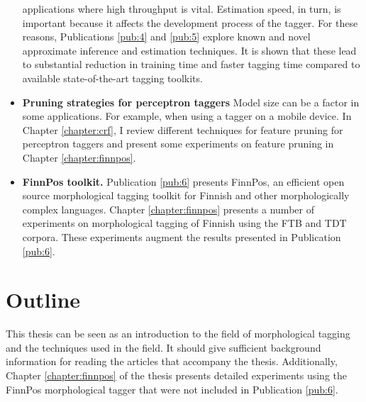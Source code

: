 \begin{itemize}
  applications where high throughput is vital. Estimation speed, in
  turn, is important because it affects the development process of the
  tagger. For these reasons, Publications \ref{pub:4} and \ref{pub:5}
  explore known and novel approximate inference and estimation
  techniques. It is shown that these lead to substantial reduction in
  training time and faster tagging time compared to available
  state-of-the-art tagging toolkits.
\item {\bf Pruning strategies for perceptron taggers} Model size can
  be a factor in some applications. For example, when using a tagger
  on a mobile device. In Chapter \ref{chapter:crf}, I review different
  techniques for feature pruning for perceptron taggers and present
  some experiments on feature pruning in Chapter
  \ref{chapter:finnpos}.
\item {\bf FinnPos toolkit.} Publication \ref{pub:6} presents FinnPos,
  an efficient open source morphological tagging toolkit for Finnish
  and other morphologically complex languages. Chapter
  \ref{chapter:finnpos} presents a number of experiments on
  morphological tagging of Finnish using the FTB and TDT
  corpora. These experiments augment the results presented in
  Publication \ref{pub:6}.
\end{itemize}


\section{Outline}
This thesis can be seen as an introduction to the field of
morphological tagging and the techniques used in the field. It should
give sufficient background information for reading the articles that
accompany the thesis. Additionally, Chapter \ref{chapter:finnpos} of
the thesis presents detailed experiments using the FinnPos
morphological tagger that were not included in Publication
\ref{pub:6}.

